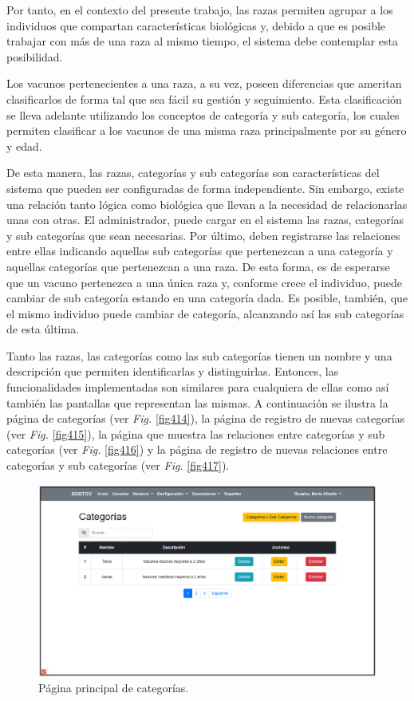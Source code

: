 \documentclass[11pt,oneside]{book}
\begin{document}
Por tanto, en el contexto del presente trabajo, las razas permiten agrupar a los individuos que compartan características biológicas y, debido a que es posible trabajar con más de una raza al mismo tiempo, el sistema debe contemplar esta posibilidad.

Los vacunos pertenecientes a una raza, a su vez, poseen diferencias que ameritan clasificarlos de forma tal que sea fácil su gestión y seguimiento. Esta clasificación se lleva adelante utilizando los conceptos de categoría y sub categoría, los cuales permiten clasificar a los vacunos de una misma raza principalmente por su género y edad.

De esta manera, las razas, categorías y sub categorías son características del sistema que pueden ser configuradas de forma independiente. Sin embargo, existe una relación tanto lógica como biológica que llevan a la necesidad de relacionarlas unas con otras. El administrador, puede cargar en el sistema las razas, categorías y sub categorías que sean necesarias. Por último, deben registrarse las relaciones entre ellas indicando aquellas sub categorías que pertenezcan a una categoría y aquellas categorías que pertenezcan a una raza. De esta forma, es de esperarse que un vacuno pertenezca a una única raza y, conforme crece el individuo, puede cambiar de sub categoría estando en una categoría dada. Es posible, también, que el mismo individuo puede cambiar de categoría, alcanzando así las sub categorías de esta última.

Tanto las razas, las categorías como las sub categorías tienen un nombre y una descripción que permiten identificarlas y distinguirlas. Entonces, las funcionalidades implementadas son similares para cualquiera de ellas como así también las pantallas que representan las mismas. A continuación se ilustra la página de categorías (ver \textit{Fig.} \eqref{fig414}), la página de registro de nuevas categorías (ver \textit{Fig.} \eqref{fig415}), la página que muestra las relaciones entre categorías y sub categorías (ver \textit{Fig.} \eqref{fig416}) y la página de registro de nuevas relaciones entre categorías y sub categorías (ver \textit{Fig.} \eqref{fig417}). 
\begin{figure}[tbhp]
\centerline{\includegraphics[scale=0.87]{figs/capitulo_3_desarrollo/fig414.pdf}}
\caption{Página principal de categorías.}
\label{fig414}
\end{figure}
\end{document}
